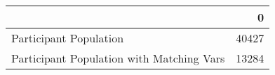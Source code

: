 \begin{tabular}{lr}
\toprule
{} &      0 \\
\midrule
Participant Population                    &  40427 \\
Participant Population with Matching Vars &  13284 \\
\bottomrule
\end{tabular}

